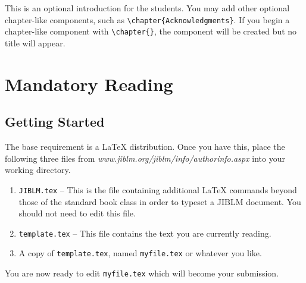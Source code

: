 
This is an optional introduction for the students.  You may add other
optional chapter-like components, such as
\verb|\chapter{Acknowledgments}|.  If you begin a chapter-like
component with \verb|\chapter{}|, the component will be created but
no title will appear.




\mainmatter




\chapter{Mandatory Reading}

\section{Getting Started}

The base requirement is  a \LaTeX{} distribution. Once you have this, place the following
three files from \emph{www.jiblm.org/jiblm/info/authorinfo.aspx} into your working directory.

\begin{enumerate}
 \item \texttt{JIBLM.tex} -- This is the file containing additional \LaTeX{} commands
       beyond those of the standard book class in order to typeset a JIBLM document.  You should not need
       to edit this file.
 \item \texttt{template.tex} -- This file contains the text you are currently reading.
 \item A copy of \texttt{template.tex}, named \texttt{myfile.tex} or whatever you like.
\end{enumerate}

\noindent
You are now ready to edit \texttt{myfile.tex} which will become your submission.

